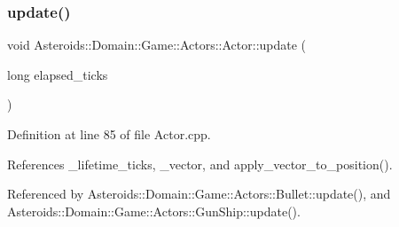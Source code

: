 \mbox{\label{classAsteroids_1_1Domain_1_1Game_1_1Actors_1_1Actor_a5a53ac407eec2feb06f167d1a496bbe5}} 
\subsubsection{\texorpdfstring{update()}{update()}}
{\footnotesize\ttfamily void Asteroids\+::\+Domain\+::\+Game\+::\+Actors\+::\+Actor\+::update (\begin{DoxyParamCaption}\item[{long}]{elapsed\+\_\+ticks }\end{DoxyParamCaption})}



Definition at line 85 of file Actor.\+cpp.



References \+\_\+lifetime\+\_\+ticks, \+\_\+vector, and apply\+\_\+vector\+\_\+to\+\_\+position().



Referenced by Asteroids\+::\+Domain\+::\+Game\+::\+Actors\+::\+Bullet\+::update(), and Asteroids\+::\+Domain\+::\+Game\+::\+Actors\+::\+Gun\+Ship\+::update().

